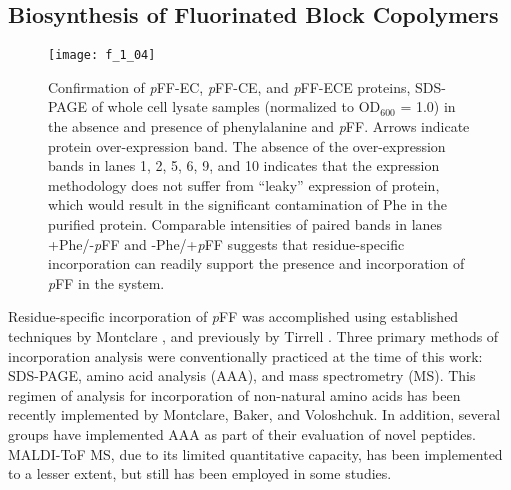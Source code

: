 \begin{refsection}
\subsection{Biosynthesis of Fluorinated Block Copolymers}
\label{sec:biosynthesis_results}
\begin{figure}[h!] \centering \texttt{[image: f\_1\_04]}
    \caption[Confirmation of
        \emph{p}FF-EC, \emph{p}FF-CE, and \emph{p}FF-ECE proteins, SDS-PAGE of
        whole cell lysate samples (normalized to OD{$_{600}$} = 1.0) in the
        absence and presence of phenylalanine and \emph{p}FF. Arrows indicate
        protein over-expression band. The absence of the over-expression bands
        in lanes 1, 2, 5, 6, 9, and 10 indicates that the expression methodology
        does not suffer from ``leaky'' expression of protein, which would result
        in the significant contamination of Phe in the purified protein.
        Comparable intensities of paired bands in lanes +Phe/-\emph{p}FF and
        -Phe/+\emph{p}FF suggests that residue-specific incorporation can
        readily support the presence and incorporation of \emph{p}FF in the
    system.] {Confirmation of
        \emph{p}FF-EC, \emph{p}FF-CE, and \emph{p}FF-ECE proteins, SDS-PAGE of
        whole cell lysate samples (normalized to OD{$_{600}$} = 1.0) in the
        absence and presence of phenylalanine and \emph{p}FF. Arrows indicate
        protein over-expression band. The absence of the over-expression bands
        in lanes 1, 2, 5, 6, 9, and 10 indicates that the expression methodology
        does not suffer from ``leaky'' expression of protein, which would result
        in the significant contamination of Phe in the purified protein.
        Comparable intensities of paired bands in lanes +Phe/-\emph{p}FF and
        -Phe/+\emph{p}FF suggests that residue-specific incorporation can
        readily support the presence and incorporation of \emph{p}FF in the
    system.}
        \label{fig:expression_gel_pFF} \end{figure}
Residue-specific incorporation of \emph{p}FF was accomplished using 
established techniques by Montclare , and previously by Tirrell
.\cite{Yoshikawa1994,Sharma2000,Voloshchuk2009} Three primary methods of
incorporation analysis were conventionally practiced at the time of this work:
SDS-PAGE, amino acid analysis (AAA), and mass spectrometry (MS). 
This regimen of analysis for incorporation of non-natural amino acids has been
recently implemented by Montclare, Baker, and
Voloshchuk\cite{Voloshchuk2009,Panchenko2006,Baker2011}. In
addition, several groups have implemented AAA as part of their evaluation of novel
peptides. MALDI-ToF MS, due to its limited quantitative capacity, has been
implemented to a lesser extent, but still has been employed in some
studies.\cite{Taki2001}


\end{refsection}
